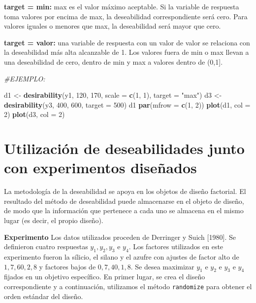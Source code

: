 \documentclass[
]{book}
\newenvironment{Shaded}{\begin{snugshade}}{\end{snugshade}}
\newcommand{\AttributeTok}[1]{\textcolor[rgb]{0.13,0.29,0.53}{#1}}
\newcommand{\CommentTok}[1]{\textcolor[rgb]{0.56,0.35,0.01}{\textit{#1}}}
\newcommand{\DecValTok}[1]{\textcolor[rgb]{0.00,0.00,0.81}{#1}}
\newcommand{\FunctionTok}[1]{\textcolor[rgb]{0.13,0.29,0.53}{\textbf{#1}}}
\newcommand{\NormalTok}[1]{#1}
\newcommand{\OtherTok}[1]{\textcolor[rgb]{0.56,0.35,0.01}{#1}}
\newcommand{\StringTok}[1]{\textcolor[rgb]{0.31,0.60,0.02}{#1}}
\begin{document}
\textbf{target = min:} max es el valor máximo aceptable. Si la variable de respuesta toma valores por encima de max, la deseabilidad correspondiente será cero. Para valores iguales o menores que max, la deseabilidad será mayor que cero.

\textbf{target = valor:} una variable de respuesta con un valor de valor se relaciona con la deseabilidad más alta alcanzable de 1. Los valores fuera de min o max llevan a una deseabilidad de cero, dentro de min y max a valores dentro de (0,1{]}.

\begin{Shaded}
\begin{Highlighting}[]
\CommentTok{\#EJEMPLO:}

\NormalTok{d1 }\OtherTok{\textless{}{-}} \FunctionTok{desirability}\NormalTok{(y1, }\DecValTok{120}\NormalTok{, }\DecValTok{170}\NormalTok{, }\AttributeTok{scale =} \FunctionTok{c}\NormalTok{(}\DecValTok{1}\NormalTok{, }\DecValTok{1}\NormalTok{), }\AttributeTok{target =} \StringTok{"max"}\NormalTok{)}
\NormalTok{d3 }\OtherTok{\textless{}{-}} \FunctionTok{desirability}\NormalTok{(y3, }\DecValTok{400}\NormalTok{, }\DecValTok{600}\NormalTok{, }\AttributeTok{target =} \DecValTok{500}\NormalTok{)}
\NormalTok{d1}
\FunctionTok{par}\NormalTok{(}\AttributeTok{mfrow =} \FunctionTok{c}\NormalTok{(}\DecValTok{1}\NormalTok{, }\DecValTok{2}\NormalTok{))}
\FunctionTok{plot}\NormalTok{(d1, }\AttributeTok{col =} \DecValTok{2}\NormalTok{)}
\FunctionTok{plot}\NormalTok{(d3, }\AttributeTok{col =} \DecValTok{2}\NormalTok{)}
\end{Highlighting}
\end{Shaded}

\hypertarget{utilizaciuxf3n-de-deseabilidades-junto-con-experimentos-diseuxf1ados}{%
\section{Utilización de deseabilidades junto con experimentos diseñados}\label{utilizaciuxf3n-de-deseabilidades-junto-con-experimentos-diseuxf1ados}}

La metodología de la deseabilidad se apoya en los objetos de diseño factorial. El resultado
del método de deseabilidad puede almacenarse en el objeto de diseño, de modo que la información que
pertenece a cada uno se almacena en el mismo lugar (es decir, el propio diseño).

\textbf{Experimento}
Los datos utilizados proceden de Derringer y Suich {[}1980{]}. Se definieron cuatro respuestas \(y_1, y_2, y_3\) e \(y_4\).
Los factores utilizados en este experimento fueron la sílicio, el silano y el azufre con ajustes de factor alto de \(1,7, 60, 2,8\) y factores bajos de \(0,7, 40, 1,8\). Se desea maximizar \(y_1\) e \(y_2\)
e \(y_3\) e \(y_4\) fijados en un objetivo específico.
En primer lugar, se crea el diseño correspondiente y a continuación, utilizamos el método \texttt{randomize} para obtener el orden estándar del diseño.
\end{document}
